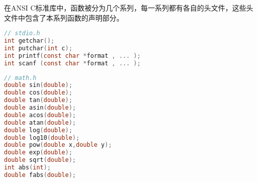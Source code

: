 \begin{frame}[fragile]
在ANSI C标准库中，函数被分为几个系列，每一系列都有各自的头文件，这些头文件中包含了本系列函数的声明部分。
\end{frame}

\begin{frame}[fragile]
  \begin{lstlisting}[language=c,backgroundcolor=\color{red!10}]
// stdio.h 
int getchar();
int putchar(int c);
int printf(const char *format , ... );
int scanf (const char *format , ... );
\end{lstlisting}
\end{frame}

\begin{frame}[fragile]
  \begin{lstlisting}[language=c,backgroundcolor=\color{red!10}]
// math.h
double sin(double);   
double cos(double);   
double tan(double);   
double asin(double);  
double acos(double); 
double atan(double); 
double log(double);  
double log10(double); 
double pow(double x,double y); 
double exp(double); 
double sqrt(double); 
int abs(int);  
double fabs(double); 
\end{lstlisting}
\end{frame}
